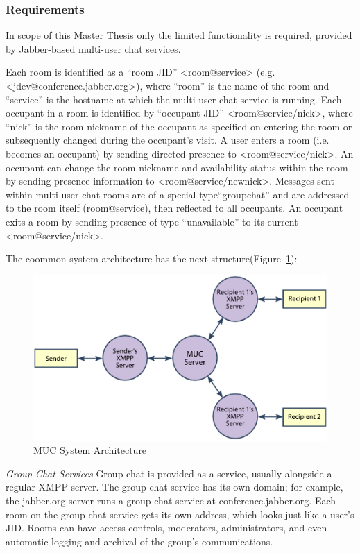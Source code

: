 \subsubsection{Requirements}
In scope of this Master Thesis only the limited functionality is required, provided by Jabber-based multi-user chat services. 

Each room is identified as a ``room JID'' <room@service> (e.g. <jdev@conference.jabber.org>), where ``room'' is the name of the room and ``service'' is the hostname at which the multi-user chat service is running. Each occupant in a room is identified by ``occupant JID'' <room@service/nick>, where ``nick'' is the room nickname of the occupant as specified on entering the room or subsequently changed during the occupant's visit. A user enters a room (i.e. becomes an occupant) by sending directed presence to <room@service/nick>. An occupant can change the room nickname and availability status within the room by sending presence information to <room@service/newnick>. Messages sent within multi-user chat rooms are of a special type``groupchat'' and are addressed to the room itself (room@service), then reflected to all occupants. An occupant exits a room by sending presence of type ``unavailable'' to its current <room@service/nick>.

The coommon system architecture has the next structure(Figure~\ref{img:muc-architecture}):
  \begin{figure}[!ht]
		\centering
		\includegraphics[scale=0.8]{images/MUC.png}   
		\caption[MUC]{MUC System Architecture}     
		\label{img:muc-architecture}                    
		\end{figure}

\emph{Group Chat Services}
\newline
Group chat is provided as a service, usually alongside a regular XMPP server. The group chat service has its own domain; for example, the jabber.org server runs a group chat service at conference.jabber.org. Each room on the group chat service gets its own address, which looks just like a user’s JID. Rooms can have access controls, moderators, administrators, and even automatic logging and archival of the group’s communications.


